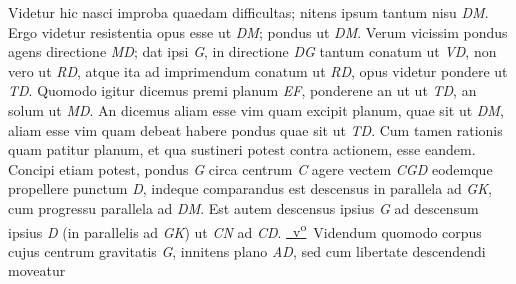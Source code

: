 \pstart
Videtur hic nasci improba quaedam difficultas; nitens 
ipsum tantum nisu \textit{DM}. Ergo videtur resistentia opus esse ut \textit{DM}; 
pondus ut \textit{D}\textit{M}. Verum vicissim pondus agens directione \textit{MD}; dat ipsi \textit{G}, in directione \textit{DG} tantum conatum ut \textit{VD}, non vero ut \textit{RD}, atque ita ad imprimendum conatum ut \textit{RD}, opus videtur pondere ut \textit{TD}. Quomodo igitur dicemus premi planum \textit{EF}, ponderene 
an ut 
\ledpb%
ut \textit{TD}, an solum ut \textit{MD}. An dicemus aliam esse vim quam excipit planum, 
quae sit ut \textit{DM}, aliam esse vim quam debeat habere pondus quae sit ut \textit{TD}. Cum tamen rationis 
quam patitur planum, et qua sustineri potest contra actionem, esse eandem.
\pend
\pstart
Concipi etiam potest, pondus \textit{G} circa centrum \textit{C} agere vectem \textit{CGD}
eodemque propellere punctum \textit{D}, indeque comparandus est descensus 
in parallela ad \textit{GK}, cum progressu
parallela ad \textit{D}\textit{M}. Est autem descensus ipsius \textit{G} ad descensum ipsius \textit{D} (in parallelis ad \textit{GK}) ut \textit{CN} ad \textit{CD}.
\pend
\pstart
\href{\Scan{LH_35_10_14_009v}}%
{~v\textsuperscript{o}\rbrack}\ 
Videndum quomodo corpus cujus centrum gravitatis \textit{G}, innitens plano \textit{AD}, sed cum libertate descendendi moveatur 
